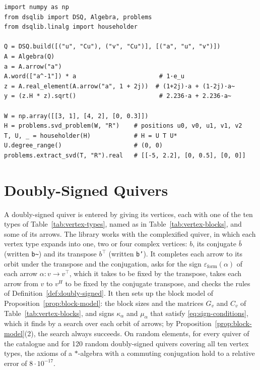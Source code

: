\documentclass[12pt, a4paper]{report}
\theoremstyle{plain}
\theoremstyle{definition}
\theoremstyle{remark}
\theoremstyle{plain}
\newcommand{\epsilonform}{\varepsilon_{\mathrm{form}}}
\begin{document}
\begin{lstlisting}[float=tbp,label={lst:session},caption={A session with \texttt{dsqlib}: arithmetic in the algebra of the complex SVD quiver, and Example~\ref{ex:golub-kahan-numbers} run by the generic Householder algorithm. The comments show the values computed.}]
import numpy as np
from dsqlib import DSQ, Algebra, problems
from dsqlib.linalg import householder

Q = DSQ.build([("u", "Cu"), ("v", "Cu")], [("a", "u", "v")])
A = Algebra(Q)
a = A.arrow("a")
A.word(["a^-1"]) * a                       # 1·e_u
z = A.real_element(A.arrow("a", 1 + 2j))  # (1+2j)·a + (1-2j)·a~
y = (z.H * z).sqrt()                       # 2.236·a + 2.236·a~

W = np.array([[3, 1], [4, 2], [0, 0.3]])
H = problems.svd_problem(W, "R")    # positions u0, v0, u1, v1, v2
T, U, _ = householder(H)            # H = U T U*
U.degree_range()                    # (0, 0)
problems.extract_svd(T, "R").real   # [[-5, 2.2], [0, 0.5], [0, 0]]
\end{lstlisting}

\section{Doubly-Signed Quivers}
\label{sec:impl-quivers}
A doubly-signed quiver is entered by giving its vertices, each with one of the ten types of Table~\ref{tab:vertex-types}, named as in Table~\ref{tab:vertex-blocks}, and some of its arrows. The library works with the complexified quiver, in which each vertex type expands into one, two or four complex vertices: $b$, its conjugate $\bar b$ (written \texttt{b\textasciitilde}) and its transpose $b^{\top}$ (written \texttt{b'}). It completes each arrow to its orbit under the transpose and the conjugation, asks for the sign $\epsilonform(\alpha)$ of each arrow $\alpha:v\to v^{\top}$, which it takes to be fixed by the transpose, takes each arrow from $v$ to $v^H$ to be fixed by the conjugate transpose, and checks the rules of Definition~\ref{def:doubly-signed}. It then sets up the block model of Proposition~\ref{prop:block-model}: the block sizes and the matrices $G_v$ and $C_v$ of Table~\ref{tab:vertex-blocks}, and signs $\kappa_\alpha$ and $\mu_\alpha$ that satisfy \eqref{eq:sign-conditions}, which it finds by a search over each orbit of arrows; by Proposition~\ref{prop:block-model}(2), the search always succeeds. On random elements, for every quiver of the catalogue and for 120 random doubly-signed quivers covering all ten vertex types, the axioms of a $*$-algebra with a commuting conjugation hold to a relative error of $8\cdot10^{-17}$.
\end{document}
